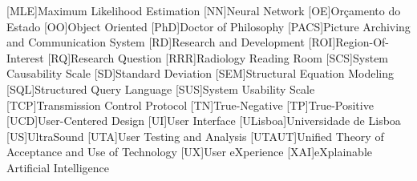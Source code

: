 \begin{acronym}[H.264/SVC]
[MLE]{Maximum Likelihood Estimation}
[NN]{Neural Network}
[OE]{Or\c{c}amento do Estado}
[OO]{Object Oriented}
[PhD]{Doctor of Philosophy}
[PACS]{Picture Archiving and Communication System}
[RD]{Research and Development}
[ROI]{Region-Of-Interest}
[RQ]{Research Question}
[RRR]{Radiology Reading Room}
[SCS]{System Causability Scale}
[SD]{Standard Deviation}
[SEM]{Structural Equation Modeling}
[SQL]{Structured Query Language}
[SUS]{System Usability Scale}
[TCP]{Transmission Control Protocol}
[TN]{True-Negative}
[TP]{True-Positive}
[UCD]{User-Centered Design}
[UI]{User Interface}
[ULisboa]{Universidade de Lisboa}
[US]{UltraSound}
[UTA]{User Testing and Analysis}
[UTAUT]{Unified Theory of Acceptance and Use of Technology}
[UX]{User eXperience}
[XAI]{eXplainable Artificial Intelligence}
\end{acronym}